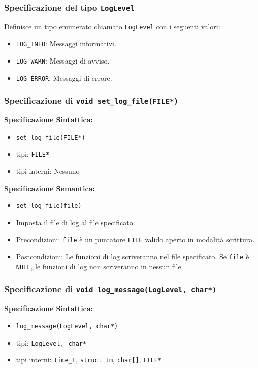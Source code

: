 \documentclass[11pt]{scrartcl} %
\begin{document}
\subsubsection{Specificazione del tipo \texttt{LogLevel}}

Definisce un tipo enumerato chiamato \texttt{LogLevel} con i seguenti valori:
\begin{itemize}
	\item \texttt{LOG\_INFO}: Messaggi informativi.
	\item \texttt{LOG\_WARN}: Messaggi di avviso.
	\item \texttt{LOG\_ERROR}: Messaggi di errore.
\end{itemize}

\subsubsection{Specificazione di \texttt{void set\_log\_file(FILE*)}}

\textbf{Specificazione Sintattica:}
\begin{itemize}
	\item \texttt{set\_log\_file(FILE*)}
	\item tipi: \texttt{FILE*}
	\item tipi interni: Nessuno
\end{itemize}

\textbf{Specificazione Semantica:}
\begin{itemize}
	\item \texttt{set\_log\_file(file)}
	\item Imposta il file di log al file specificato.
	\item Precondizioni: \texttt{file} è un puntatore \texttt{FILE} valido aperto in modalità scrittura.
	\item Postcondizioni: Le funzioni di log scriveranno nel file specificato. Se \texttt{file} è \texttt{NULL}, le funzioni di log non scriveranno in nessun file.
\end{itemize}



\subsubsection{Specificazione di \texttt{void log\_message(LogLevel, char*)}}

\textbf{Specificazione Sintattica:}
\begin{itemize}
	\item \texttt{log\_message(LogLevel,  char*)}
	\item tipi: \texttt{LogLevel}, \texttt{ char*}
	\item tipi interni: \texttt{time\_t}, \texttt{struct tm}, \texttt{char[]}, \texttt{FILE*}
\end{itemize}
\end{document}
